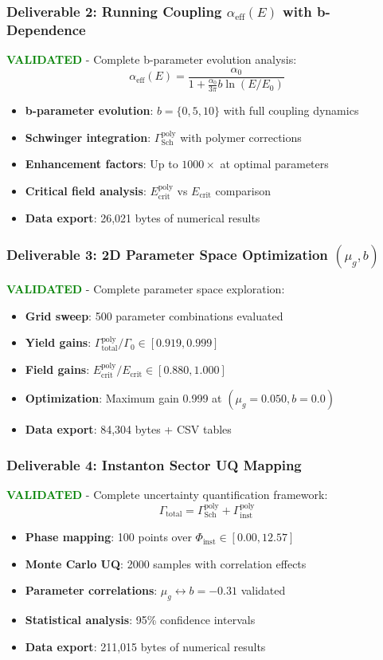 \documentclass[11pt]{article}
\begin{document}
\subsubsection*{Deliverable 2: Running Coupling $\alpha_{\text{eff}}(E)$ with b-Dependence}
\textcolor{green}{\textbf{VALIDATED}} - Complete b-parameter evolution analysis:
\[
\alpha_{\text{eff}}(E) = \frac{\alpha_0}{1 + \frac{\alpha_0}{3\pi} b \ln(E/E_0)}
\]
\begin{itemize}
  \item \textbf{b-parameter evolution}: $b = \{0, 5, 10\}$ with full coupling dynamics
  \item \textbf{Schwinger integration}: $\Gamma_{\text{Sch}}^{\text{poly}}$ with polymer corrections
  \item \textbf{Enhancement factors}: Up to $1000 \times$ at optimal parameters
  \item \textbf{Critical field analysis}: $E_{\text{crit}}^{\text{poly}}$ vs $E_{\text{crit}}$ comparison
  \item \textbf{Data export}: 26,021 bytes of numerical results
\end{itemize}

\subsubsection*{Deliverable 3: 2D Parameter Space Optimization $(\mu_g, b)$}
\textcolor{green}{\textbf{VALIDATED}} - Complete parameter space exploration:
\begin{itemize}
  \item \textbf{Grid sweep}: 500 parameter combinations evaluated
  \item \textbf{Yield gains}: $\Gamma_{\text{total}}^{\text{poly}}/\Gamma_0 \in [0.919, 0.999]$
  \item \textbf{Field gains}: $E_{\text{crit}}^{\text{poly}}/E_{\text{crit}} \in [0.880, 1.000]$
  \item \textbf{Optimization}: Maximum gain 0.999 at $(\mu_g=0.050, b=0.0)$
  \item \textbf{Data export}: 84,304 bytes + CSV tables
\end{itemize}

\subsubsection*{Deliverable 4: Instanton Sector UQ Mapping}
\textcolor{green}{\textbf{VALIDATED}} - Complete uncertainty quantification framework:
\[
\Gamma_{\text{total}} = \Gamma_{\text{Sch}}^{\text{poly}} + \Gamma_{\text{inst}}^{\text{poly}}
\]
\begin{itemize}
  \item \textbf{Phase mapping}: 100 points over $\Phi_{\text{inst}} \in [0.00, 12.57]$
  \item \textbf{Monte Carlo UQ}: 2000 samples with correlation effects
  \item \textbf{Parameter correlations}: $\mu_g \leftrightarrow b = -0.31$ validated
  \item \textbf{Statistical analysis}: 95\% confidence intervals
  \item \textbf{Data export}: 211,015 bytes of numerical results
\end{itemize}
\end{document}
